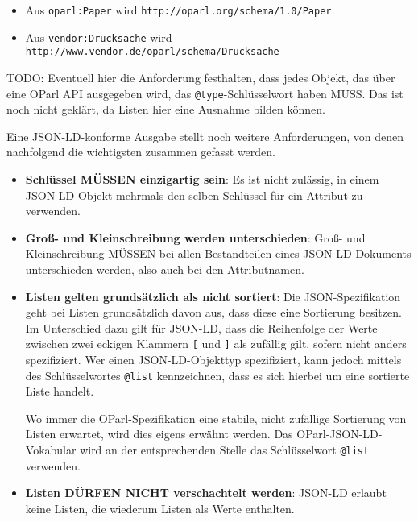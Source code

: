 \documentclass[,a4paper]{article}
\begin{document}
\begin{itemize}
\itemsep1pt\parskip0pt
\item
  Aus \texttt{oparl:Paper} wird
  \texttt{http://oparl.org/schema/1.0/Paper}
\item
  Aus \texttt{vendor:Drucksache} wird
  \texttt{http://www.vendor.de/oparl/schema/Drucksache}
\end{itemize}

TODO: Eventuell hier die Anforderung festhalten, dass jedes Objekt, das
über eine OParl API ausgegeben wird, das \texttt{@type}-Schlüsselwort
haben MUSS. Das ist noch nicht geklärt, da Listen hier eine Ausnahme
bilden können.

Eine JSON-LD-konforme Ausgabe stellt noch weitere Anforderungen, von
denen nachfolgend die wichtigsten zusammen gefasst werden.

\begin{itemize}
\item
  \textbf{Schlüssel MÜSSEN einzigartig sein}: Es ist nicht zulässig, in
  einem JSON-LD-Objekt mehrmals den selben Schlüssel für ein Attribut zu
  verwenden.
\item
  \textbf{Groß- und Kleinschreibung werden unterschieden}: Groß- und
  Kleinschreibung MÜSSEN bei allen Bestandteilen eines JSON-LD-Dokuments
  unterschieden werden, also auch bei den Attributnamen.
\item
  \textbf{Listen gelten grundsätzlich als nicht sortiert}: Die
  JSON-Spezifikation geht bei Listen grundsätzlich davon aus, dass diese
  eine Sortierung besitzen. Im Unterschied dazu gilt für JSON-LD, dass
  die Reihenfolge der Werte zwischen zwei eckigen Klammern \texttt{{[}}
  und \texttt{{]}} als zufällig gilt, sofern nicht anders spezifiziert.
  Wer einen JSON-LD-Objekttyp spezifiziert, kann jedoch mittels des
  Schlüsselwortes \texttt{@list} kennzeichnen, dass es sich hierbei um
  eine sortierte Liste handelt.

  Wo immer die OParl-Spezifikation eine stabile, nicht zufällige
  Sortierung von Listen erwartet, wird dies eigens erwähnt werden. Das
  OParl-JSON-LD-Vokabular wird an der entsprechenden Stelle das
  Schlüsselwort \texttt{@list} verwenden.
\item
  \textbf{Listen DÜRFEN NICHT verschachtelt werden}: JSON-LD erlaubt
  keine Listen, die wiederum Listen als Werte enthalten.
\end{itemize}

\end{document}
